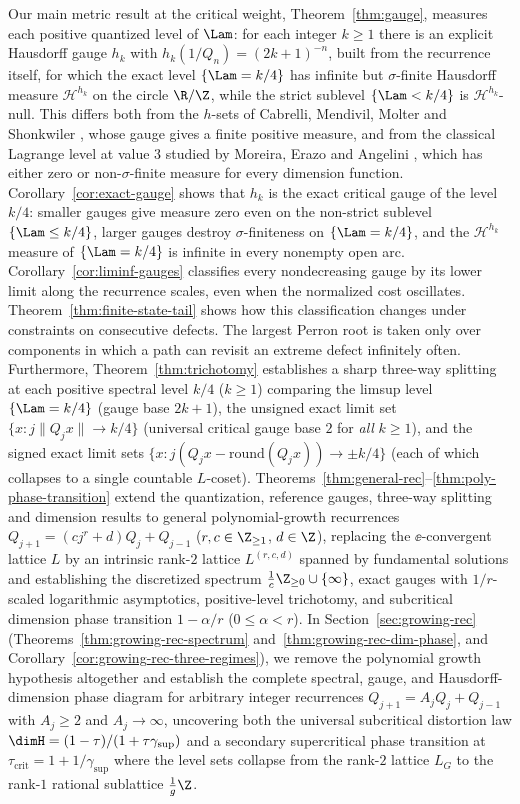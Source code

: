 Our main metric result at the critical weight, Theorem~\ref{thm:gauge},
measures each positive quantized level of $\Lam$: for each integer $k\ge1$
there is an explicit Hausdorff gauge $h_k$ with $h_k(1/Q_n)=(2k+1)^{-n}$, built
from the recurrence itself, for which the exact level $\{\Lam=k/4\}$ has
infinite but $\sigma$-finite Hausdorff measure $\mathcal H^{h_k}$ on the circle
$\R/\Z$, while the strict sublevel $\{\Lam<k/4\}$ is $\mathcal H^{h_k}$-null.
This differs both from the $h$-sets of Cabrelli, Mendivil, Molter and
Shonkwiler \cite[\S5, Theorem~3]{CMMS}, whose gauge gives a finite positive
measure, and from the classical Lagrange level at value $3$ studied by Moreira,
Erazo and Angelini \cite{MEA}, which has either zero or non-$\sigma$-finite
measure for every dimension function. Corollary~\ref{cor:exact-gauge} shows
that $h_k$ is the exact critical gauge of the level $k/4$: smaller gauges give
measure zero even on the non-strict sublevel $\{\Lam\le k/4\}$, larger gauges
destroy $\sigma$-finiteness on $\{\Lam=k/4\}$, and the $\mathcal H^{h_k}$
measure of $\{\Lam=k/4\}$ is infinite in every nonempty open arc.
Corollary~\ref{cor:liminf-gauges} classifies every nondecreasing gauge by
its lower limit along the recurrence scales, even when the normalized
cost oscillates. Theorem~\ref{thm:finite-state-tail} shows how this
classification changes under constraints on consecutive defects.
The largest Perron root is taken only over components in which a path
can revisit an extreme defect infinitely often.
Furthermore, Theorem~\ref{thm:trichotomy} establishes a sharp three-way
splitting at each positive spectral level $k/4$ ($k\ge1$) comparing the limsup
level $\{\Lam=k/4\}$ (gauge base $2k+1$), the unsigned exact limit set
$\{x:j\|Q_jx\|\to k/4\}$ (universal critical gauge base $2$ for \emph{all}
$k\ge1$), and the signed exact limit sets
$\{x:j(Q_jx-\mathrm{round}(Q_jx))\to\pm k/4\}$ (each of which collapses to a
single countable $L$-coset). Theorems~\ref{thm:general-rec}--\ref{thm:poly-phase-transition}
extend the quantization, reference gauges, three-way splitting and
dimension results to general polynomial-growth recurrences
$Q_{j+1}=(cj^r+d)Q_j+Q_{j-1}$ ($r,c\in\Z_{\ge1}$, $d\in\Z$), replacing the
$\ee$-convergent lattice $L$ by an intrinsic rank-$2$ lattice $L^{(r,c,d)}$
spanned by fundamental solutions and establishing the discretized spectrum
$\frac1c\Z_{\ge0}\cup\{\infty\}$, exact gauges with $1/r$-scaled logarithmic
asymptotics, positive-level trichotomy, and subcritical dimension phase
transition $1-\alpha/r$ ($0\le\alpha<r$). In Section~\ref{sec:growing-rec}
(Theorems~\ref{thm:growing-rec-spectrum} and~\ref{thm:growing-rec-dim-phase},
and Corollary~\ref{cor:growing-rec-three-regimes}), we remove the polynomial
growth hypothesis altogether and establish the complete spectral, gauge, and
Hausdorff-dimension phase diagram for arbitrary integer recurrences
$Q_{j+1}=A_jQ_j+Q_{j-1}$ with $A_j\ge2$ and $A_j\to\infty$, uncovering both the
universal subcritical distortion law $\dimH=(1-\tau)/(1+\tau\gamma_{\sup})$ and
a secondary supercritical phase transition at $\tau_{\mathrm{crit}}=1+1/\gamma_{\sup}$
where the level sets collapse from the rank-$2$ lattice $L_G$ to the rank-$1$
rational sublattice $\frac{1}{g}\Z$.

